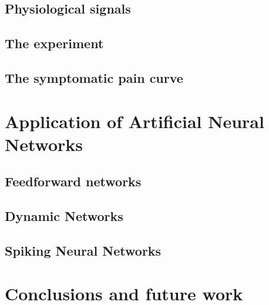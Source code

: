 \documentclass[a4paper,10pt,english]{report} %
\begin{document}
\section{Physiological signals}

\section{The experiment}

\section{The symptomatic pain curve}


\chapter{Application of Artificial Neural Networks}

\section{Feedforward networks}

\section{Dynamic Networks}

\section{Spiking Neural Networks}


\chapter{Conclusions and future work}

%





\cleardoublepage
\end{document}
